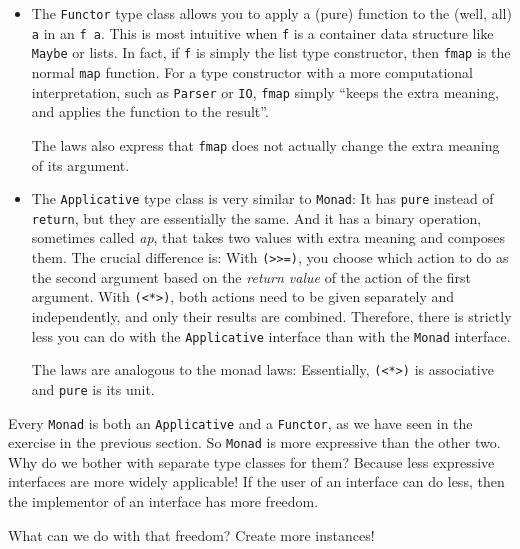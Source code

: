 \documentclass[11pt,
  american,
  DIV13]{article}
\begin{document}
\begin{itemize}
\item
  The \texttt{Functor} type class allows you to apply a (pure) function
  to the (well, all) \texttt{a} in an \texttt{f\ a}. This is most
  intuitive when \texttt{f} is a container data structure like
  \texttt{Maybe} or lists. In fact, if \texttt{f} is simply the list
  type constructor, then \texttt{fmap} is the normal \texttt{map}
  function. For a type constructor with a more computational
  interpretation, such as \texttt{Parser} or \texttt{IO}, \texttt{fmap}
  simply ``keeps the extra meaning, and applies the function to the
  result''.

  The laws also express that \texttt{fmap} does not actually change the
  extra meaning of its argument.
\item
  The \texttt{Applicative} type class is very similar to \texttt{Monad}:
  It has \texttt{pure} instead of \texttt{return}, but they are
  essentially the same. And it has a binary operation, sometimes called
  \emph{ap}, that takes two values with extra meaning and composes them.
  The crucial difference is: With
  \texttt{(\textgreater{}\textgreater{}=)}, you choose which action to
  do as the second argument based on the \emph{return value} of the
  action of the first argument. With
  \texttt{(\textless{}*\textgreater{})}, both actions need to be given
  separately and independently, and only their results are combined.
  Therefore, there is strictly less you can do with the
  \texttt{Applicative} interface than with the \texttt{Monad} interface.

  The laws are analogous to the monad laws: Essentially,
  \texttt{(\textless{}*\textgreater{})} is associative and \texttt{pure}
  is its unit.
\end{itemize}

Every \texttt{Monad} is both an \texttt{Applicative} and a
\texttt{Functor}, as we have seen in the exercise in the previous
section. So \texttt{Monad} is more expressive than the other two. Why do
we bother with separate type classes for them? Because less expressive
interfaces are more widely applicable! If the user of an interface can
do less, then the implementor of an interface has more freedom.

What can we do with that freedom? Create more instances!
\end{document}
